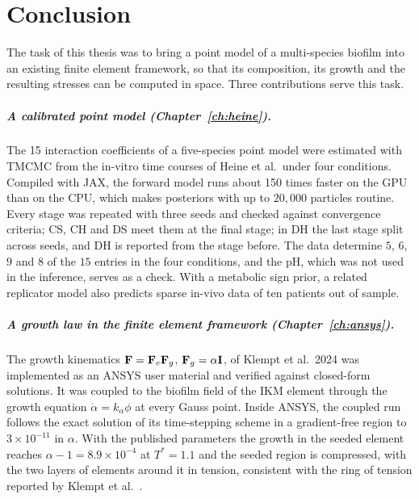 \chapter{Conclusion}
\label{ch:conclusion}


The task of this thesis was to bring a point model of a multi-species biofilm
into an existing finite element framework, so that its composition, its growth
and the resulting stresses can be computed in space. Three contributions serve
this task.

\paragraph{A calibrated point model (Chapter~\ref{ch:heine}).}
The 15 interaction coefficients of a five-species point model were estimated
with TMCMC from the in-vitro time courses of Heine et al.\ under four
conditions. Compiled with JAX, the forward model runs about 150 times faster
on the GPU than on the CPU, which makes posteriors with up to $20{,}000$ particles routine. Every stage was
repeated with three seeds and checked against convergence criteria; CS, CH and DS
meet them at the final stage; in DH the last stage split across seeds, and DH
is reported from the stage before. The data
determine $5$, $6$, $9$ and $8$ of the $15$ entries in the four conditions, and the
pH, which was not used in the inference, serves as a check. With a metabolic sign prior, a related replicator model
also predicts sparse in-vivo data of ten patients out of sample.

\paragraph{A growth law in the finite element framework (Chapter~\ref{ch:ansys}).}
The growth kinematics $\mathbf{F}=\mathbf{F}_e\mathbf{F}_g$, $\mathbf{F}_g=\alpha\mathbf{I}$, of Klempt et
al.\ 2024 was implemented as an ANSYS user material and verified against
closed-form solutions. It was coupled to the biofilm field of the IKM element
through the growth equation $\dot\alpha=k_\alpha\phi$ at every Gauss point.
Inside ANSYS, the coupled run follows the exact solution of its time-stepping
scheme in a gradient-free region to $3\times10^{-11}$ in $\alpha$. With the published parameters the
growth in the seeded element reaches $\alpha-1=8.9\times10^{-4}$ at $T^*=1.1$
and the seeded region is compressed, with the two layers of elements around it
in tension, consistent with the
ring of tension reported by Klempt et al.~\cite{Klempt2024DiffusionDrivenGrowth}.

